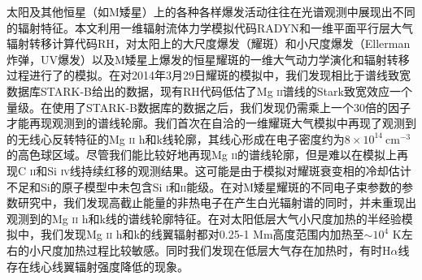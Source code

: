 
\begin{cabstract}
	太阳及其他恒星（如M矮星）上的各种各样爆发活动往往在光谱观测中展现出不同的辐射特征。本文利用一维辐射流体力学模拟代码RADYN和一维平面平行层大气辐射转移计算代码RH，对太阳上的大尺度爆发（耀斑）和小尺度爆发（Ellerman炸弹，UV爆发）以及M矮星上爆发的恒星耀斑的一维大气动力学演化和辐射转移过程进行了的模拟。在对2014年3月29日耀斑的模拟中，我们发现相比于谱线致宽数据库STARK-B给出的数据，现有RH代码低估了Mg \textsc{ii}谱线的Stark致宽效应一个量级。在使用了STARK-B数据库的数据之后，我们发现仍需乘上一个30倍的因子才能再现观测到的谱线轮廓。我们首次在自洽的一维耀斑大气模拟中再现了观测到的无线心反转特征的Mg \textsc{ii} h和k线轮廓，其线心形成在电子密度约为$8\times 10^{14}\ \mathrm{cm^{-3}}$的高色球区域。尽管我们能比较好地再现Mg \textsc{ii}的谱线轮廓，但是难以在模拟上再现C \textsc{ii}和Si \textsc{iv}线持续红移的观测结果。这可能是由于模拟对耀斑衰变相的冷却估计不足和Si的原子模型中未包含Si \textsc{i}和\textsc{ii}能级。在对M矮星耀斑的不同电子束参数的参数研究中，我们发现高截止能量的非热电子在产生白光辐射谱的同时，并未重现出观测到的Mg \textsc{ii} h和k线的谱线轮廓特征。在对太阳低层大气小尺度加热的半经验模拟中，我们发现Mg \textsc{ii} h和k的线翼辐射都对0.25-1 Mm高度范围内加热至$\sim 10^4$ K左右的小尺度加热过程比较敏感。同时我们发现在低层大气存在加热时，有时H$\alpha$线存在线心线翼辐射强度降低的现象。
	
\end{cabstract}

